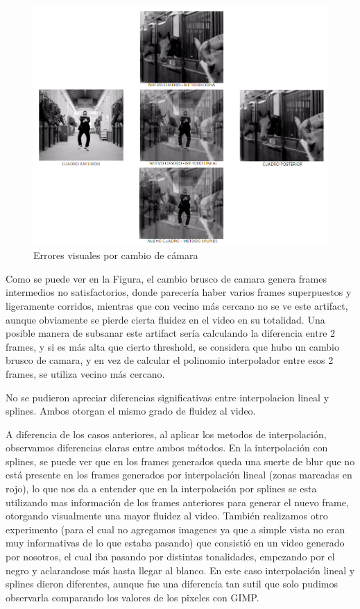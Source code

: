 \begin{figure}[h!]
  \centering
    \includegraphics[scale= 0.8]{imagenes/gangman.png}
  \caption{Errores visuales por cambio de cámara}
\end{figure}

Como se puede ver en la Figura, el cambio brusco de camara genera frames intermedios no satisfactorios, donde parecería haber varios frames superpuestos y ligeramente corridos, mientras que con vecino más cercano no se ve este artifact, aunque obviamente se pierde cierta fluidez en el video en su totalidad.
Una posible manera de subsanar este artifact sería calculando la diferencia entre 2 frames, y si es más alta que cierto threshold, se considera que hubo un cambio brusco de camara, y en vez de calcular el polinomio interpolador entre esos 2 frames, se utiliza vecino más cercano.

No se pudieron apreciar diferencias significativas entre interpolacion lineal y splines. Ambos otorgan el mismo grado de fluidez al video.


A diferencia de los casos anteriores, al aplicar los metodos de interpolación, observamos diferencias claras entre ambos métodos. En la interpolación con splines, se puede ver que en los frames generados queda una suerte de blur que no está presente en los frames generados por interpolación lineal (zonas marcadas en rojo), lo que nos da a entender que en la interpolación por splines se esta utilizando mas información de los frames anteriores para generar el nuevo frame, otorgando visualmente una mayor fluidez al video.
También realizamos otro experimento (para el cual no agregamos imagenes ya que a simple vista no eran muy informativas de lo que estaba pasando) que consistió en un video generado por nosotros, el cual iba pasando por distintas tonalidades, empezando por el negro y aclarandose más hasta llegar al blanco. En este caso interpolación lineal y splines dieron diferentes, aunque fue una diferencia tan sutil que solo pudimos observarla comparando los valores de los pixeles con GIMP.


